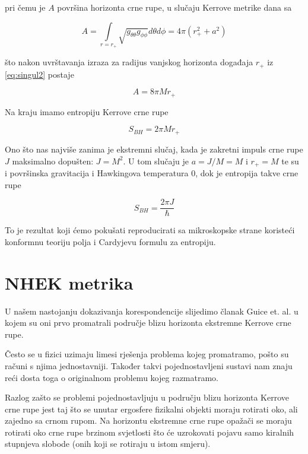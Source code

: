 \noindent pri čemu je $A$ površina horizonta crne rupe, u slučaju Kerrove metrike dana sa \citep{wald2010general}

\begin{equation}
A=\int\limits_{r=r_+}\sqrt{g_{\theta\theta}g_{\phi\phi}}d\theta d\phi=4\pi(r_+^2+a^2)
\end{equation}

\noindent što nakon uvrštavanja izraza za radijus vanjskog horizonta događaja $r_+$ iz \eqref{eq:singul2} postaje

\begin{equation}
A=8\pi M r_+
\end{equation}

\noindent Na kraju imamo entropiju Kerrove crne rupe 

\begin{equation}
S_{BH}=2\pi Mr_+
\label{eq:BekenHawkingEnt}
\end{equation}

\noindent Ono što nas najviše zanima je ekstremni slučaj, kada je zakretni impuls crne rupe $J$ maksimalno dopušten: $J=M^2$. U tom slučaju je $a=J/M=M$ i $r_+=M$ te su i površinska gravitacija i Hawkingova temperatura 0, dok je entropija takve crne rupe

\begin{equation}
S_{BH}=\frac{2\pi J}{\hbar}
\end{equation}

\noindent To je rezultat koji ćemo pokušati reproducirati sa mikroskopske strane koristeći konformnu teoriju polja i Cardyjevu formulu za entropiju.

\section{NHEK metrika}\label{sec:NHEK}

U našem nastojanju dokazivanja korespondencije slijedimo članak Guice et. al. \citep{Guica:2008mu} u kojem su oni prvo promatrali područje blizu horizonta ekstremne Kerrove crne rupe.

Često se u fizici uzimaju limesi rješenja problema kojeg promatramo, pošto su računi s njima jednostavniji. Također takvi pojednostavljeni sustavi nam znaju reći dosta toga o originalnom problemu kojeg razmatramo.

Razlog zašto se problemi pojednostavljuju u području blizu horizonta Kerrove crne rupe jest taj što se unutar ergosfere fizikalni objekti moraju rotirati oko, ali zajedno sa crnom rupom. Na horizontu ekstremne crne rupe opažači se moraju rotirati oko crne rupe brzinom svjetlosti što će uzrokovati pojavu samo kiralnih stupnjeva slobode (onih koji se rotiraju u istom smjeru).

